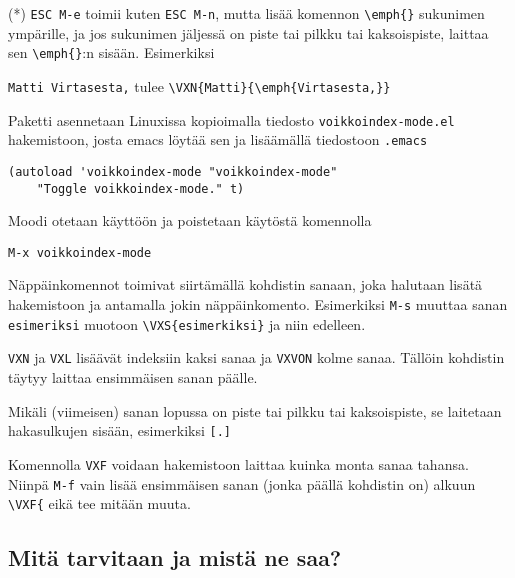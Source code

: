 \documentclass[12pt]{article}
\begin{document}
(*) \verb=ESC M-e= toimii kuten \verb=ESC M-n=, mutta lisää komennon
\verb=\emph{}= sukunimen ympärille, ja jos sukunimen jäljessä on piste
tai pilkku tai kaksoispiste, laittaa sen \verb=\emph{}=:n sisään.
Esimerkiksi

\verb=Matti Virtasesta,= tulee \verb=\VXN{Matti}{\emph{Virtasesta,}}=

Paketti asennetaan Linuxissa kopioimalla tiedosto
\verb=voikkoindex-mode.el= hakemistoon, josta emacs löytää sen ja
lisäämällä tiedostoon \verb=.emacs=

\begin{verbatim}
(autoload 'voikkoindex-mode "voikkoindex-mode"
    "Toggle voikkoindex-mode." t)
\end{verbatim}

Moodi otetaan käyttöön ja poistetaan käytöstä komennolla

\verb=M-x voikkoindex-mode=

Näppäinkomennot toimivat siirtämällä kohdistin sanaan, joka halutaan
lisätä hakemistoon ja antamalla jokin näppäinkomento. Esimerkiksi
\verb=M-s= muuttaa sanan \verb=esimeriksi= muotoon
\verb=\VXS{esimerkiksi}= ja niin edelleen.

\verb=VXN= ja \verb=VXL= lisäävät indeksiin kaksi sanaa ja
\verb=VXVON= kolme sanaa. Tällöin kohdistin täytyy laittaa ensimmäisen
sanan päälle.

Mikäli (viimeisen) sanan lopussa on piste tai pilkku tai kaksoispiste,
se laitetaan hakasulkujen sisään, esimerkiksi \verb=[.]=

Komennolla \verb=VXF= voidaan hakemistoon laittaa kuinka monta sanaa
tahansa. Niinpä \verb=M-f= vain lisää ensimmäisen sanan (jonka päällä
kohdistin on) alkuun \verb=\VXF{= eikä tee mitään muuta.


\newpage
\subsection*{Mitä tarvitaan ja mistä ne saa?}
\end{document}
